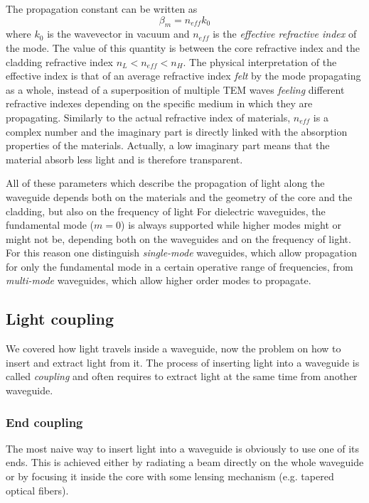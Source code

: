 The propagation constant can be written as
\begin{equation}
\beta_m = n_{eff} k_0
\end{equation}
where $k_0$ is the wavevector in vacuum and $n_{eff}$ is the \textit{effective refractive index} of the mode.
The value of this quantity is between the core refractive index and the cladding refractive index $n_L < n_{eff} < n_H$.
The physical interpretation of the effective index is that of an average refractive index \textit{felt} by the mode propagating as a whole, instead of a superposition of multiple TEM waves \textit{feeling} different refractive indexes depending on the specific medium in which they are propagating.
Similarly to the actual refractive index of materials, $n_{eff}$ is a complex number and the imaginary part is directly linked with the absorption properties of the materials.
Actually, a low imaginary part means that the material absorb less light and is therefore transparent.

All of these parameters which describe the propagation of light along the waveguide depends both on the materials and the geometry of the core and the cladding, but also on the frequency of light
For dielectric waveguides, the fundamental mode ($m=0$) is always supported while higher modes might or might not be, depending both on the waveguides and on the frequency of light.
For this reason one distinguish \textit{single-mode} waveguides, which allow propagation for only the fundamental mode in a certain operative range of frequencies, from \textit{multi-mode} waveguides, which allow higher order modes to propagate.

\subsection{Light coupling}
\label{ssec:light_coupling}
We covered how light travels inside a waveguide, now the problem on how to insert and extract light from it.
The process of inserting light into a waveguide is called \textit{coupling} and often requires to extract light at the same time from another waveguide.

\subsubsection{End coupling}
\label{sssec:end_coupling}
The most naive way to insert light into a waveguide is obviously to use one of its ends.
This is achieved either by radiating a beam directly on the whole waveguide or by focusing it inside the core with some lensing mechanism (e.g. tapered optical fibers).

